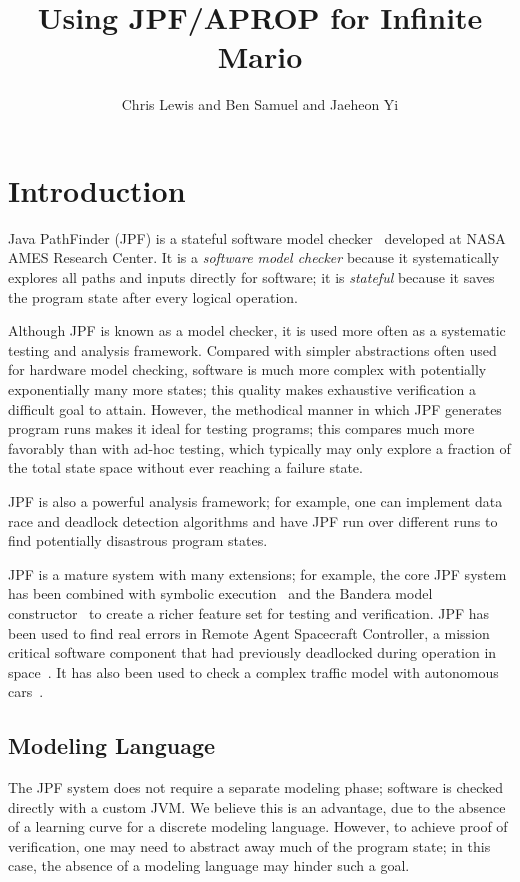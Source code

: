 \documentclass[twocolumn]{article}
\title{Using JPF/APROP for Infinite Mario}
\author{Chris Lewis and Ben Samuel and Jaeheon Yi}
\begin{document}
\maketitle

\section{Introduction}
Java PathFinder (JPF) is a stateful software model checker~\cite{DBLP:journals/ase/VisserHBPL03} developed at NASA AMES Research Center. 
It is a \emph{software model checker} because it systematically explores all paths and inputs directly for software;
it is \emph{stateful} because it saves the program state after every logical operation. 

Although JPF is known as a model checker, it is used more often as a systematic testing and analysis framework. 
Compared with simpler abstractions often used for hardware model checking, software is much more complex with potentially exponentially many more states;
this quality makes exhaustive verification a difficult goal to attain. 
However, the methodical manner in which JPF generates program runs makes it ideal for testing programs; 
this compares much more favorably than with ad-hoc testing, which typically may only explore a fraction of the total state space without ever reaching a failure state. 

JPF is also a powerful analysis framework; for example, one can implement data race and deadlock detection algorithms and have JPF run over different runs to find potentially disastrous program states. 

JPF is a mature system with many extensions; for example, the core JPF system has been combined with symbolic execution~\cite{DBLP:conf/tacas/AnandPV07} and the Bandera model constructor~\cite{DBLP:conf/fmoods/Dwyer02} to create a richer feature set for testing and verification. 
JPF has been used to find real errors in Remote Agent Spacecraft Controller, a mission critical software component that had previously deadlocked during operation in space~\cite{DBLP:journals/ase/VisserHBPL03}. 
It has also been used to check a complex traffic model with autonomous cars~\cite{DBLP:conf/atva/2005}. 

\subsection{Modeling Language}

The JPF system does not require a separate modeling phase; software is checked directly with a custom JVM. 
We believe this is an advantage, due to the absence of a learning curve for a discrete modeling language. 
However, to achieve proof of verification, one may need to abstract away much of the program state; 
in this case, the absence of a modeling language may hinder such a goal. 
\end{document}
